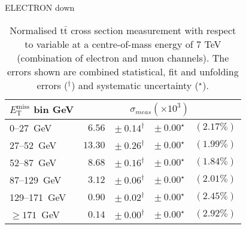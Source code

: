 \documentclass{article}
\newcommand{\ttbar}{\ensuremath{\text{t}\bar{\text{t}}}\xspace}
\newcommand{\GeV}{GeV}
\begin{document}
ELECTRON down
\begin{table}[H]
\setlength{\tabcolsep}{2pt}
\centering
\caption{Normalised \ttbar cross section measurement with respect to \MET variable
at a centre-of-mass energy of 7 TeV (combination of electron and muon channels). The errors shown are combined statistical, fit and unfolding errors ($^\dagger$) and systematic uncertainty ($^\star$).}
\label{tab:MET_xsections_7TeV_Electron_down_combined}
\begin{tabular}{lrrrr}
\hline
$E_{\mathrm{T}}^{\mathrm{miss}}$ bin GeV & \multicolumn{4}{c}{$\sigma_{meas} \left(\times 10^{3}\right)$}\\ 
\hline
0--27~\GeV &  $6.56$ & $ \pm~ 0.14^\dagger$ & $ \pm~ 0.00^\star$ & $(2.17\%)$\\ 
27--52~\GeV &  $13.30$ & $ \pm~ 0.26^\dagger$ & $ \pm~ 0.00^\star$ & $(1.99\%)$\\ 
52--87~\GeV &  $8.68$ & $ \pm~ 0.16^\dagger$ & $ \pm~ 0.00^\star$ & $(1.84\%)$\\ 
87--129~\GeV &  $3.12$ & $ \pm~ 0.06^\dagger$ & $ \pm~ 0.00^\star$ & $(2.01\%)$\\ 
129--171~\GeV &  $0.90$ & $ \pm~ 0.02^\dagger$ & $ \pm~ 0.00^\star$ & $(2.45\%)$\\ 
$\geq 171$~\GeV &  $0.14$ & $ \pm~ 0.00^\dagger$ & $ \pm~ 0.00^\star$ & $(2.92\%)$\\ 
\hline 
\end{tabular}
\end{table}
\end{document}
